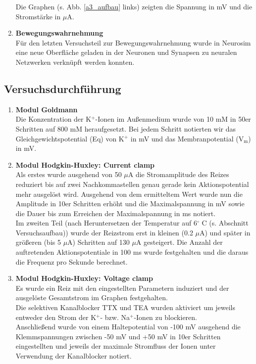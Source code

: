\documentclass[11pt]{article}
\begin{document}
\begin{enumerate}
Die Graphen (s. Abb. \ref{a3_aufbau} links) zeigten die Spannung in mV und die Stromstärke in $\mu$A.

\item \textbf{Bewegungswahrnehmung} \\
Für den letzten Versuchsteil zur Bewegungswahrnehmung wurde in Neurosim eine neue Oberfläche geladen in der Neuronen und Synapsen zu neuralen Netzwerken verknüpft werden konnten.
\end{enumerate}

\subsection{Versuchsdurchführung}
\begin{enumerate}
\item \textbf{Modul Goldmann} \\
Die Konzentration der K$^+$-Ionen im Außenmedium wurde von 10 mM in 50er Schritten auf 800 mM heraufgesetzt. Bei jedem Schritt notierten wir das Gleichgewichtspotential (Eq) von K$^+$ in mV und das Membranpotential (V$_\text{m}$) in mV.

\item \textbf{Modul Hodgkin-Huxley: Current clamp}\\
Als erstes wurde ausgehend von 50 $\mu$A die Stromamplitude des Reizes reduziert bis auf zwei Nachkommastellen genau gerade kein Aktionspotential mehr ausgelöst wird. Ausgehend von dem ermitteltem Wert wurde nun die Amplitude in 10er Schritten erhöht und die Maximalspannung in mV sowie die Dauer bis zum Erreichen der Maximalspannung in ms notiert.\\

Im zweiten Teil (nach Heruntersetzen der Temperatur auf 6$^\circ$ C (s. Abschnitt Versuchsaufbau)) wurde der Reizstrom erst in kleinen (0.2 $\mu$A) und später in größeren (bis 5 $\mu$A) Schritten auf 130 $\mu$A gesteigert. Die Anzahl der auftretenden Aktionspotentiale in 100 ms wurde festgehalten und die daraus die Frequenz pro Sekunde berechnet.

\item \textbf{Modul Hodgkin-Huxley: Voltage clamp}\\
Es wurde ein Reiz mit den eingestellten Parametern induziert und der ausgelöste Gesamtstrom im Graphen festgehalten.\\
Die selektiven Kanalblocker TTX und TEA wurden aktiviert um jeweils entweder den Strom der K$^+$- bzw. Na$^+$-Ionen zu blockieren.\\
Anschließend wurde von einem Haltepotential von -100 mV ausgehend die Klemmspannungen zwischen -50 mV und +50 mV in 10er Schritten eingestellten und jeweils der maximale Stromfluss der Ionen unter Verwendung der Kanalblocker notiert.


\end{enumerate}
\end{document}
